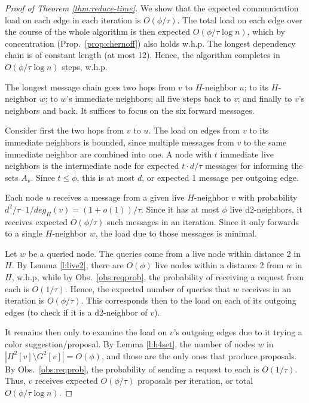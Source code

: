 \documentclass[12pt]{article}
\begin{document}
\begin{proof}[Proof of Theorem \ref{thm:reduce-time}]
We show that the expected communication load on each edge in each iteration is $O(\phi/\tau)$. The total load on each edge 
over the course of the whole algorithm is then expected $O(\phi/\tau \log n)$, which by concentration (Prop.~\ref{prop:chernoff}) also holds w.h.p. 
The longest dependency chain is of constant length (at most 12).
Hence, the algorithm completes in $O(\phi/\tau \log n)$ steps, w.h.p.

The longest message chain goes two hops from $v$ to $H$-neighbor $u$; to its $H$-neighbor $w$; to $w$'s immediate neighbors; all five steps back to $v$; and finally to $v$'s neighbors and back.
It suffices to focus on the six forward messages. 

Consider first the two hops from $v$ to $u$.
The load on edges from $v$ to its immediate neighbors is bounded, since multiple messages from $v$ to the same immediate neighbor are combined into one. 
A node with $t$ immediate live neighbors is the intermediate node for expected $t \cdot d/\tau$ messages for informing the sets $A_v$. Since $t \le \phi$, this is at most $d$, or expected 1 message per outgoing edge.

Each node $u$ receives a message from a given live $H$-neighbor $v$ with probability $d^2/\tau \cdot 1/deg_H(v) = (1+o(1))/\tau$. Since it has at most $\phi$ live d2-neighbors, it receives expected $O(\phi/\tau)$ such messages in an iteration. Since it only forwards to a single $H$-neighbor $w$, the load due to those messages is minimal. 

Let $w$ be a queried node. The queries come from a live node within distance 2 in $H$. By Lemma \ref{l:live2}, there are $O(\phi)$ live nodes within a distance 2 from $w$ in $H$, w.h.p, while by Obs.~\ref{obs:reqprob}, the probability of receiving a request from each is $O(1/\tau)$. Hence, the expected number of queries that $w$ receives in an iteration is $O(\phi/\tau)$. This corresponds then to the load on each of its outgoing edges (to check if it is a d2-neighbor of $v$). 

It remains then only to examine the load on $v$'s outgoing edges due to it trying a color suggestion/proposal. 
 By Lemma \ref{l:h4set}, the number of nodes $w$ in $|H^2[v] \setminus G^2[v]| = O(\phi)$, and those are the only ones that produce proposals. By Obs.~\ref{obs:reqprob}, the probability of sending a request to each is $O(1/\tau)$.
 Thus, $v$ receives expected $O(\phi/\tau)$ proposals per iteration, or total $O(\phi/\tau \log n)$.
\end{proof}
\end{document}
